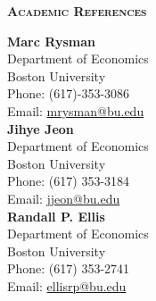 \documentclass[11pt,overlapped,line,letterpaper]{res}
\begin{document}
\begin{resume}
\begin{flushleft}
\textbf{\textsc{Academic References}}
\end{flushleft}
\begin{multicols}{3}

{\bf Marc Rysman} \\
Department of Economics \\
Boston University \\
Phone: (617)-353-3086 \\ 
Email: \href{mailto:mrysman@bu.edu}{mrysman@bu.edu} \\

{\bf Jihye Jeon} \\
Department of Economics \\
Boston University \\
Phone:  (617) 353-3184 \\ 
Email: \href{mailto:jjeon@bu.edu}{jjeon@bu.edu} \\

{\bf Randall P. Ellis} \\
Department of Economics \\
Boston University \\
Phone: (617) 353-2741 \\ 
Email: \href{mailto:ellisrp@bu.edu}{ellisrp@bu.edu} \\
\end{multicols}

\end{resume}
%
\end{document}
